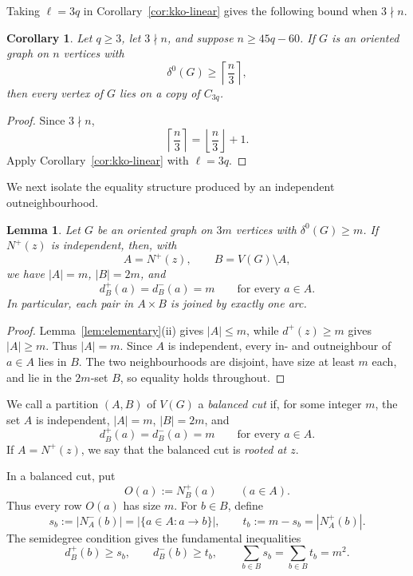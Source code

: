\documentclass[11pt]{amsart}
\newtheorem{lemma}[theorem]{Lemma}
\newtheorem{corollary}[theorem]{Corollary}
\theoremstyle{definition}
\begin{document}
Taking $\ell=3q$ in Corollary~\ref{cor:kko-linear} gives the following
bound when $3\nmid n$.

\begin{corollary}\label{cor:nonzero-residue}
Let $q\ge3$, let $3\nmid n$, and suppose $n\ge45q-60$.  If $G$ is an
oriented graph on $n$ vertices with
\[
  \delta^0(G)\ge\left\lceil\frac n3\right\rceil,
\]
then every vertex of $G$ lies on a copy of $C_{3q}$.
\end{corollary}

\begin{proof}
Since $3\nmid n$,
\[
  \left\lceil\frac n3\right\rceil
  =\left\lfloor\frac n3\right\rfloor+1.
\]
Apply Corollary~\ref{cor:kko-linear} with $\ell=3q$.
\end{proof}

We next isolate the equality structure produced by an independent outneighbourhood.

\begin{lemma}\label{lem:balanced-cut}
Let $G$ be an oriented graph on $3m$ vertices with $\delta^0(G)\ge m$.  If $N^+(z)$ is independent, then, with
\[
  A=N^+(z),\qquad B=V(G)\setminus A,
\]
we have $|A|=m$, $|B|=2m$, and
\[
  d_B^+(a)=d_B^-(a)=m
  \qquad\text{for every }a\in A.
\]
In particular, each pair in $A\times B$ is joined by exactly one arc.
\end{lemma}

\begin{proof}
Lemma~\ref{lem:elementary}(ii) gives $|A|\le m$, while $d^+(z)\ge m$ gives $|A|\ge m$.  Thus $|A|=m$.  Since $A$ is independent, every in- and outneighbour of $a\in A$ lies in $B$.  The two neighbourhoods are disjoint, have size at least $m$ each, and lie in the $2m$-set $B$, so equality holds throughout.
\end{proof}

We call a partition $(A,B)$ of $V(G)$ a \emph{balanced cut} if, for
some integer $m$, the set $A$ is independent, $|A|=m$, $|B|=2m$, and
\[
  d_B^+(a)=d_B^-(a)=m
  \qquad\text{for every }a\in A.
\]
If $A=N^+(z)$, we say that the balanced cut is \emph{rooted at $z$}.

In a balanced cut, put
\[
  O(a):=N_B^+(a)\qquad(a\in A).
\]
Thus every row $O(a)$ has size $m$.  For $b\in B$, define
\[
  s_b:=|N_A^-(b)|=|\{a\in A:a\to b\}|,
  \qquad t_b:=m-s_b=|N_A^+(b)|.
\]
The semidegree condition gives the fundamental inequalities
\begin{equation}\label{eq:bookkeeping}
  d_B^+(b)\ge s_b,\qquad d_B^-(b)\ge t_b,\qquad
  \sum_{b\in B}s_b=\sum_{b\in B}t_b=m^2.
\end{equation}
\end{document}
